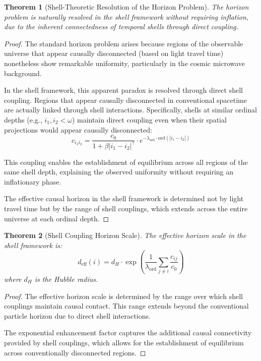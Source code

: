 \documentclass[12pt,a4paper]{article}
\newtheorem{theorem}{Theorem}[section]
\newcommand{\ord}{\text{ord}}
\begin{document}
\begin{theorem}[Shell-Theoretic Resolution of the Horizon Problem]
\label{thm:horizon-resolution}
The horizon problem is naturally resolved in the shell framework without requiring inflation, due to the inherent connectedness of temporal shells through direct coupling.
\end{theorem}

\begin{proof}
The standard horizon problem arises because regions of the observable universe that appear causally disconnected (based on light travel time) nonetheless show remarkable uniformity, particularly in the cosmic microwave background.

In the shell framework, this apparent paradox is resolved through direct shell coupling. Regions that appear causally disconnected in conventional spacetime are actually linked through shell interactions. Specifically, shells at similar ordinal depths (e.g., $i_1, i_2 < \omega$) maintain direct coupling even when their spatial projections would appear causally disconnected:
\begin{equation}
c_{i_1 i_2} = \frac{c_0}{1 + \beta |i_1-i_2|^\gamma} \cdot e^{-\lambda_{\ord} \cdot \ord(|i_1-i_2|)}
\end{equation}

This coupling enables the establishment of equilibrium across all regions of the same shell depth, explaining the observed uniformity without requiring an inflationary phase.

The effective causal horizon in the shell framework is determined not by light travel time but by the range of shell couplings, which extends across the entire universe at each ordinal depth.
\end{proof}

\begin{theorem}[Shell Coupling Horizon Scale]
\label{thm:coupling-horizon}
The effective horizon scale in the shell framework is:
\begin{equation}
d_{\text{eff}}(i) = d_H \cdot \exp\left(\frac{1}{\lambda_{\ord}} \sum_{j \neq i} \frac{c_{ij}}{c_0}\right)
\end{equation}
where $d_H$ is the Hubble radius.
\end{theorem}

\begin{proof}
The effective horizon scale is determined by the range over which shell couplings maintain causal contact. This range extends beyond the conventional particle horizon due to direct shell interactions.

The exponential enhancement factor captures the additional causal connectivity provided by shell couplings, which allows for the establishment of equilibrium across conventionally disconnected regions.
\end{proof}
\end{document}
